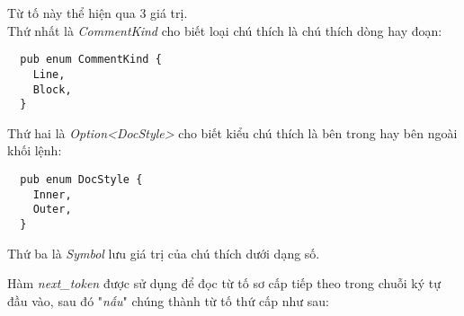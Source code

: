 \begin{itemize}
        Từ tố này thể hiện qua 3 giá trị. 
        \\Thứ nhất là \textit{CommentKind} cho biết loại chú thích là chú thích dòng hay đoạn:
  \begin{lstlisting}
  pub enum CommentKind {
    Line,
    Block,
  }
  \end{lstlisting}
        Thứ hai là \textit{Option<DocStyle>} cho biết kiểu chú thích là bên trong hay bên ngoài khối lệnh:
  \begin{lstlisting}
  pub enum DocStyle {
    Inner,
    Outer,
  }
  \end{lstlisting}
        Thứ ba là \textit{Symbol} lưu giá trị của chú thích dưới dạng số.
\end{itemize}

Hàm \textit{next\_token} được sử dụng để đọc từ tố sơ cấp tiếp theo trong chuỗi ký tự đầu vào, sau đó "\textit{nấu}" chúng thành từ tố thứ cấp như sau:

